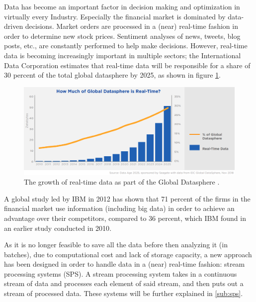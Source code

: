Data has become an important factor in decision making and optimization in virtually every Industry.
Especially the financial market is dominated by data-driven decisions. Market orders are processed in a (near) real-time fashion in order to determine 
new stock prices. Sentiment analyses of news, tweets, blog posts, etc., are constantly performed to help make decisions.
However, real-time data is becoming increasingly important in multiple sectors; the International Data Corporation estimates that real-time data will be 
responsible for a share of 30 percent of the total global datasphere by 2025, as shown in figure \ref{fig:growth_realtime_data}.
\begin{figure}[ht]
\centering
\includegraphics[width=1.0\textwidth]{Bilder/realtime_data.png}
\caption{The growth of real-time data as part of the Global Datasphere \cite[p. 13]{idc-seagate-data}.}
\label{fig:growth_realtime_data}
\end{figure}

\quad A global study led by IBM in 2012 has shown that 71 percent of the firms in the financial market use information (including big data)
in order to achieve an advantage over their competitors, compared to 36 percent, which IBM found in an earlier study conducted in 2010\cite[p. 1]{ibm-financial}.

\quad As it is no longer feasible to save all the data before then analyzing it (in batches), due to computational cost and lack of storage capacity, 
a new approach has been designed in order to handle data in a (near) real-time fashion: stream processing systems (SPS). 
A stream processing system takes in a continuous stream of data and processes each element of said stream, and then puts out a stream of processed data.
These systems will be further explained in \ref{sub:sps}.

